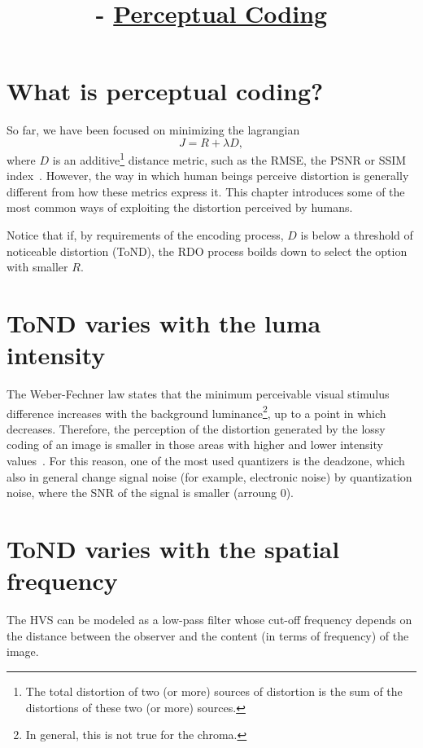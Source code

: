 

\title{\SM{} - \href{https://github.com/Sistemas-Multimedia/Sistemas-Multimedia.github.io/tree/master/contents/perceptual_coding}{Perceptual Coding}}

\maketitle
\tableofcontents

\section{What is perceptual coding?}

So far, we have been focused on minimizing the lagrangian~\cite{sullivan1998rate}
\begin{equation}
  J = R + \lambda D,
\end{equation}
where $D$ is an additive\footnote{The total distortion of two (or
  more) sources of distortion is the sum of the distortions of these
  two (or more) sources.} distance metric, such as the RMSE, the PSNR
or SSIM index~\cite{wang2004image}. However, the way in which human
beings perceive distortion is generally different from how these
metrics express it. This chapter introduces some of the most common
ways of exploiting the distortion perceived by humans.

Notice that if, by requirements of the encoding process, $D$ is below
a threshold of noticeable distortion (ToND), the RDO process boilds down to
select the option with smaller $R$.

\section{ToND varies with the luma intensity}

The Weber-Fechner law states that the minimum perceivable visual
stimulus difference increases with the background
luminance\footnote{In general, this is not true for the chroma.}, up
to a point in which decreases. Therefore, the perception of the
distortion generated by the lossy coding of an image is smaller in
those areas with higher and lower intensity
values~\cite{naccari2014perceptually}. For this reason, one of the
most used quantizers is the deadzone, which also in general change
signal noise (for example, electronic noise) by quantization noise,
where the SNR of the signal is smaller (arroung 0).

\section{ToND varies with the spatial frequency}
The HVS can be modeled as a low-pass filter whose cut-off frequency
depends on the distance between the observer and the content (in terms
of frequency) of the image.

